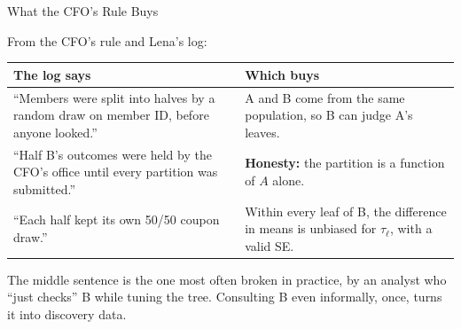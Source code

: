 \documentclass[aspectratio=169, 11pt, handout]{beamer}
\begin{document}
\begin{frame}{What the CFO's Rule Buys}

From the CFO's rule and Lena's log:

\begin{center}
\small
\begin{tabular}{p{6.2cm}p{6.6cm}}
\toprule
\textbf{The log says} & \textbf{Which buys} \\
\midrule
``Members were split into halves by a random draw on member ID, before anyone looked.'' & A and B come from the same population, so B can judge A's leaves. \\[0.4em]
``Half B's outcomes were held by the CFO's office until every partition was submitted.'' & \textbf{Honesty:} the partition is a function of $A$ alone. \\[0.4em]
``Each half kept its own 50/50 coupon draw.'' & Within every leaf of B, the difference in means is unbiased for $\tau_\ell$, with a valid SE. \\
\bottomrule
\end{tabular}
\end{center}

\bigskip

The middle sentence is the one most often broken in practice, by an analyst who ``just checks'' B while tuning the tree. Consulting B even informally, once, turns it into discovery data.
\end{frame}
\end{document}

